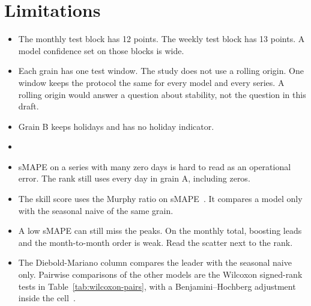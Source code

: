 \section{Limitations}
\label{sec:limitations}

\begin{itemize}
  \item The monthly test block has 12 points.
        The weekly test block has 13 points.
        A model confidence set on those blocks is wide.
  \item Each grain has one test window.
        The study does not use a rolling origin.
        One window keeps the protocol the same for every model and every series.
        A rolling origin would answer a question about stability, not the question in this draft.
  \item Grain B keeps holidays and has no holiday indicator.
  \item {}
  \item sMAPE on a series with many zero days is hard to read as an operational error.
        The rank still uses every day in grain A, including zeros.
  \item The skill score uses the Murphy ratio on sMAPE~\citep{murphy1988skill}.
        It compares a model only with the seasonal naive of the same grain.
  \item A low sMAPE can still miss the peaks.
        On the monthly total, boosting leads and the month-to-month order is weak.
        Read the scatter next to the rank.
  \item The Diebold-Mariano column compares the leader with the seasonal naive only.
        Pairwise comparisons of the other models are the Wilcoxon signed-rank tests in Table~\ref{tab:wilcoxon-pairs}, with a Benjamini--Hochberg adjustment inside the cell~\citep{benjamini1995fdr}.

\end{itemize}
